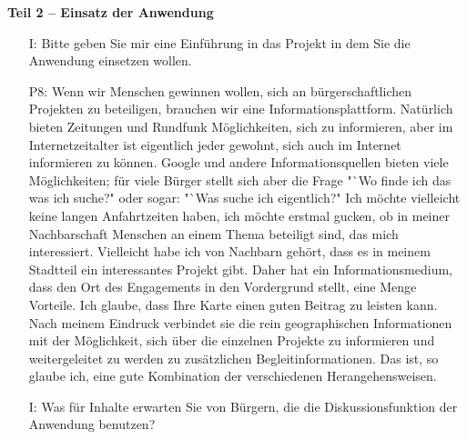 \textbf{Teil 2 -- Einsatz der Anwendung}
\begin{itemize}
    \item[I:] Bitte geben Sie mir eine Einf{\"u}hrung in das Projekt in dem Sie die Anwendung einsetzen wollen.
    \item[P8:] Wenn wir Menschen gewinnen wollen, sich an b{\"u}rgerschaftlichen Projekten zu beteiligen, brauchen wir eine Informationsplattform. Nat{\"u}rlich bieten Zeitungen und Rundfunk M{\"o}glichkeiten, sich zu informieren, aber im Internetzeitalter ist eigentlich jeder gewohnt, sich auch im Internet informieren zu k{\"o}nnen. Google und andere Informationsquellen bieten viele M{\"o}glichkeiten; f{\"u}r viele B{\"u}rger stellt sich aber die Frage "`Wo finde ich das was ich suche?" oder sogar: "`Was suche ich eigentlich?" Ich m{\"o}chte vielleicht keine langen Anfahrtzeiten haben, ich m{\"o}chte erstmal gucken, ob in meiner Nachbarschaft Menschen an einem Thema beteiligt sind, das mich interessiert. Vielleicht habe ich von Nachbarn geh{\"o}rt, dass es in meinem Stadtteil ein interessantes Projekt gibt. Daher hat ein Informationsmedium, dass den Ort des Engagements in den Vordergrund stellt, eine Menge Vorteile. Ich glaube, dass Ihre Karte einen guten Beitrag zu leisten kann. Nach meinem Eindruck verbindet sie die rein geographischen Informationen mit der M{\"o}glichkeit, sich {\"u}ber die einzelnen Projekte zu informieren und weitergeleitet zu werden zu zus{\"a}tzlichen Begleitinformationen. Das ist, so glaube ich, eine gute Kombination der verschiedenen Herangehensweisen.
    \item[I:] Was f{\"u}r Inhalte erwarten Sie von B{\"u}rgern, die die Diskussionsfunktion der Anwendung benutzen?

\end{itemize}
